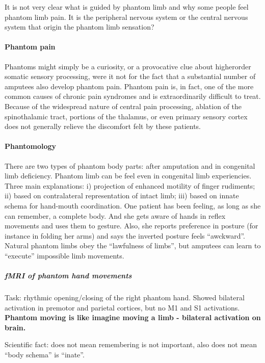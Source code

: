 \documentclass[12pt,article,oneside,a4paper]{memoir}
\begin{document}
It is not very clear what is guided by phantom limb and why some people feel 
phantom limb pain. It is the peripheral nervous system or the central nervous
system that origin the phantom limb sensation?

\paragraph{Phantom pain}
Phantoms might simply be a curiosity, or a provocative clue about higherorder 
somatic sensory processing, were it not for the fact that a substantial number 
of amputees also develop phantom pain. Phantom pain is, in fact, one of the 
more common causes of chronic pain syndromes and is extraordinarily difficult
to treat. Because of the widespread nature of central pain processing, ablation
of the spinothalamic tract, portions of the thalamus, or even primary sensory
cortex does not generally relieve the discomfort felt by these patients.

\paragraph{Phantomology}
There are two types of phantom body parts: after amputation and in congenital limb
deficiency.
Phantom limb can be feel even in congenital limb experiencies.
Three main explanations: i) projection of enhanced motility of finger rudiments;
ii) based on contralateral representation of intact limb; iii) based on innate
schema for hand-mouth coordination. 
One patient has been feeling, as long as she can remember, a complete body.
And she gets aware of hands in reflex movements and uses them to gesture.
Also, she reports preference in posture (for instance in folding her arms) and
says the inverted posture feels ``awckward''. Natural phantom limbs obey the
``lawfulness of limbs'', but amputees can learn to ``execute'' impossible limb
movements.

\subparagraph{fMRI of phantom hand movements}
Task: rhythmic opening/closing of the right phantom hand. Showed bilateral
activation in premotor and parietal cortices, but no M1 and S1 activations.
\textbf{Phantom moving is like imagine moving a limb - bilateral activation on
brain.}
 
Scientific fact: does not mean remembering is not important, also does not mean
``body schema'' is ``inate''.
\end{document}
